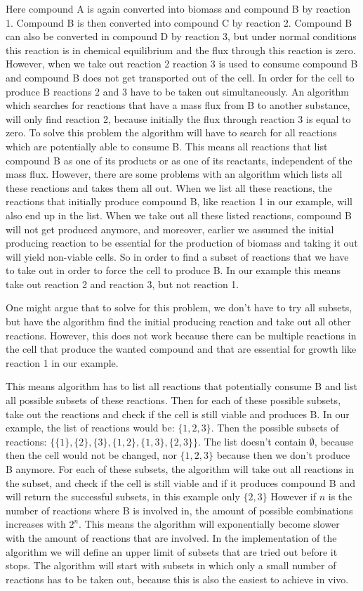 \documentclass[12pt]{report}
\begin{document}
Here compound A is again converted into biomass and compound B by reaction 1. Compound B is then converted into compound C by reaction 2. Compound B can also be converted in compound D by reaction 3, but under normal conditions this reaction is in chemical equilibrium and the flux through this reaction is zero. However, when we take out reaction 2 reaction 3 is used to consume compound B and compound B does not get transported out of the cell.
In order for the cell to produce B reactions 2 and 3 have to be taken out simultaneously.
An algorithm which searches for reactions that have a mass flux from B to another substance, will only find reaction 2, because initially the flux through reaction 3 is equal to zero. 
To solve this problem the algorithm will have to search for all reactions which are potentially able to consume B. This means all reactions that list compound B as one of its products or as one of its reactants, independent of the mass flux.
However, there are some problems with an algorithm which lists all these reactions and takes them all out.
When we list all these reactions, the reactions that initially produce compound B, like reaction 1 in our example, will also end up in the list. When we take out all these listed reactions, compound B will not get produced anymore, and moreover, earlier we assumed the initial producing reaction to be essential for the production of biomass and taking it out will yield non-viable cells.
So in order to find a subset of reactions that we have to take out in order to force the cell to produce B. In our example this means take out reaction 2 and reaction 3, but not reaction 1.

One might argue that to solve for this problem, we don't have to try all subsets, but have the algorithm find the initial producing reaction and take out all other reactions. However, this does not work because there can be multiple reactions in the cell that produce the wanted compound and that are essential for growth like reaction 1 in our example. 

This means algorithm has to list all reactions that potentially consume B and list all possible subsets of these reactions. Then for each of these possible subsets, take out the reactions and check if the cell is still viable and produces B.
In our example, the list of reactions would be: $\{1, 2, 3\}$.
Then the possible subsets of reactions: $\{\{1\},\{2\},\{3\},\{1,2\},\{1,3\},\{2,3\}\}$. The list doesn't contain $\emptyset$, because then the cell would not be changed, nor $\{1,2,3\}$ because then we don't produce B anymore. For each of these subsets, the algorithm will take out all reactions in the subset, and check if the cell is still viable and if it produces compound B and will return the successful subsets, in this example only $\{2,3\}$
However if $n$ is the number of reactions where B is involved in, the amount of possible combinations increases with $2^n$.
This means the algorithm will exponentially become slower with the amount of reactions that are involved.
In the implementation of the algorithm we will define an upper limit of subsets that are tried out before it stops. The algorithm will start with subsets in which only a small number of reactions has to be taken out, because this is also the easiest to achieve in vivo.
\end{document}
